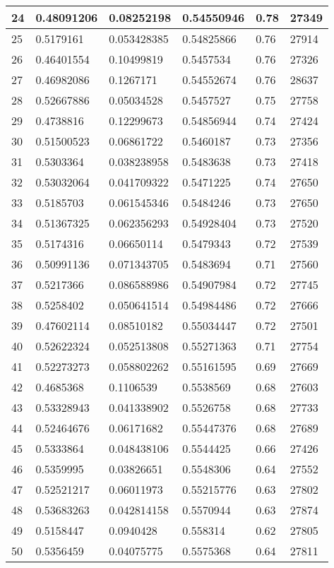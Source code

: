 \begin{longtable}{|l|l|l|l|l|l|}
24 & 0.48091206 & 0.08252198 & 0.54550946 & 0.78 & 27349 \\ \hline 
25 & 0.5179161 & 0.053428385 & 0.54825866 & 0.76 & 27914 \\ \hline 
26 & 0.46401554 & 0.10499819 & 0.5457534 & 0.76 & 27326 \\ \hline 
27 & 0.46982086 & 0.1267171 & 0.54552674 & 0.76 & 28637 \\ \hline 
28 & 0.52667886 & 0.05034528 & 0.5457527 & 0.75 & 27758 \\ \hline 
29 & 0.4738816 & 0.12299673 & 0.54856944 & 0.74 & 27424 \\ \hline 
30 & 0.51500523 & 0.06861722 & 0.5460187 & 0.73 & 27356 \\ \hline 
31 & 0.5303364 & 0.038238958 & 0.5483638 & 0.73 & 27418 \\ \hline 
32 & 0.53032064 & 0.041709322 & 0.5471225 & 0.74 & 27650 \\ \hline 
33 & 0.5185703 & 0.061545346 & 0.5484246 & 0.73 & 27650 \\ \hline 
34 & 0.51367325 & 0.062356293 & 0.54928404 & 0.73 & 27520 \\ \hline 
35 & 0.5174316 & 0.06650114 & 0.5479343 & 0.72 & 27539 \\ \hline 
36 & 0.50991136 & 0.071343705 & 0.5483694 & 0.71 & 27560 \\ \hline 
37 & 0.5217366 & 0.086588986 & 0.54907984 & 0.72 & 27745 \\ \hline 
38 & 0.5258402 & 0.050641514 & 0.54984486 & 0.72 & 27666 \\ \hline 
39 & 0.47602114 & 0.08510182 & 0.55034447 & 0.72 & 27501 \\ \hline 
40 & 0.52622324 & 0.052513808 & 0.55271363 & 0.71 & 27754 \\ \hline 
41 & 0.52273273 & 0.058802262 & 0.55161595 & 0.69 & 27669 \\ \hline 
42 & 0.4685368 & 0.1106539 & 0.5538569 & 0.68 & 27603 \\ \hline 
43 & 0.53328943 & 0.041338902 & 0.5526758 & 0.68 & 27733 \\ \hline 
44 & 0.52464676 & 0.06171682 & 0.55447376 & 0.68 & 27689 \\ \hline 
45 & 0.5333864 & 0.048438106 & 0.5544425 & 0.66 & 27426 \\ \hline 
46 & 0.5359995 & 0.03826651 & 0.5548306 & 0.64 & 27552 \\ \hline 
47 & 0.52521217 & 0.06011973 & 0.55215776 & 0.63 & 27802 \\ \hline 
48 & 0.53683263 & 0.042814158 & 0.5570944 & 0.63 & 27874 \\ \hline 
49 & 0.5158447 & 0.0940428 & 0.558314 & 0.62 & 27805 \\ \hline 
50 & 0.5356459 & 0.04075775 & 0.5575368 & 0.64 & 27811 \\ \hline 
\end{longtable}